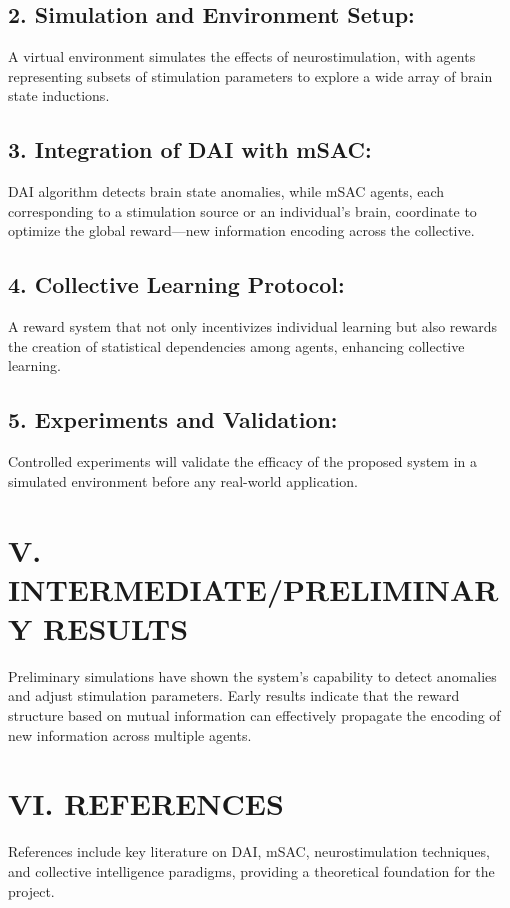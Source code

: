 \documentclass{article}
\begin{document}
\subsection*{2. Simulation and Environment Setup:}
A virtual environment simulates the effects of neurostimulation, with agents representing subsets of stimulation parameters to explore a wide array of brain state inductions.

\subsection*{3. Integration of DAI with mSAC:}
DAI algorithm detects brain state anomalies, while mSAC agents, each corresponding to a stimulation source or an individual's brain, coordinate to optimize the global reward—new information encoding across the collective.

\subsection*{4. Collective Learning Protocol:}
A reward system that not only incentivizes individual learning but also rewards the creation of statistical dependencies among agents, enhancing collective learning.

\subsection*{5. Experiments and Validation:}
Controlled experiments will validate the efficacy of the proposed system in a simulated environment before any real-world application.

\section*{V. INTERMEDIATE/PRELIMINARY RESULTS}
Preliminary simulations have shown the system's capability to detect anomalies and adjust stimulation parameters. Early results indicate that the reward structure based on mutual information can effectively propagate the encoding of new information across multiple agents.

\section*{VI. REFERENCES}
References include key literature on DAI, mSAC, neurostimulation techniques, and collective intelligence paradigms, providing a theoretical foundation for the project.
\end{document}
